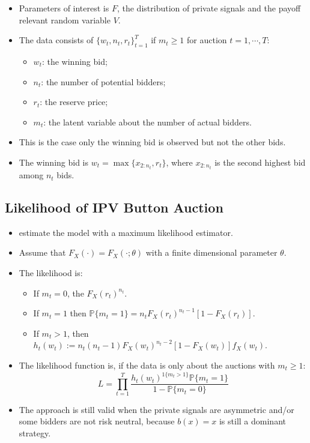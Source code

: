 \documentclass[
]{book}
\providecommand{\tightlist}{%
  \setlength{\itemsep}{0pt}\setlength{\parskip}{0pt}}
\begin{document}
\begin{itemize}
\tightlist
\item
  Parameters of interest is \(F\), the distribution of private signals and the payoff relevant random variable \(V\).
\item
  The data consists of \(\{w_t, n_t, r_t\}_{t = 1}^T\) if \(m_t \ge 1\) for auction \(t = 1, \cdots, T\):

  \begin{itemize}
  \tightlist
  \item
    \(w_t\): the winning bid;
  \item
    \(n_t\): the number of potential bidders;
  \item
    \(r_t\): the reserve price;
  \item
    \(m_t\): the latent variable about the number of actual bidders.
  \end{itemize}
\item
  This is the case only the winning bid is observed but not the other bids.
\item
  The winning bid is \(w_t = \max\{x_{2:n_t}, r_t\}\), where \(x_{2:n_t}\) is the second highest bid among \(n_t\) bids.
\end{itemize}

\hypertarget{likelihood-of-ipv-button-auction}{%
\subsection{Likelihood of IPV Button Auction}\label{likelihood-of-ipv-button-auction}}

\begin{itemize}
\tightlist
\item
  \citet{donaldIdentificationEstimationTesting1996} estimate the model with a maximum likelihood estimator.
\item
  Assume that \(F_X(\cdot) = F_X(\cdot; \theta)\) with a finite dimensional parameter \(\theta\).
\item
  The likelihood is:

  \begin{itemize}
  \tightlist
  \item
    If \(m_t = 0\), the \(F_X(r_t)^{n_t}\).
  \item
    If \(m_t = 1\) then \(\mathbb{P}\{m_t = 1\} = n_t F_X(r_t)^{n_t - 1} [1 - F_X(r_t)]\).
  \item
    If \(m_t > 1\), then \(h_t(w_t) := n_t (n_t - 1) F_X(w_t)^{n_t - 2} [1 - F_X(w_t)] f_X(w_t)\).
  \end{itemize}
\item
  The likelihood function is, if the data is only about the auctions with \(m_t \ge 1\):
  \[
  L = \prod_{t = 1}^T \frac{h_t(w_t)^{1\{m_t > 1\}} \mathbb{P}\{m_t = 1\}}{1 - \mathbb{P}\{m_t = 0\}}
  \]
\item
  The approach is still valid when the private signals are asymmetric and/or some bidders are not risk neutral, because \(b(x) = x\) is still a dominant strategy.
\end{itemize}
\end{document}
